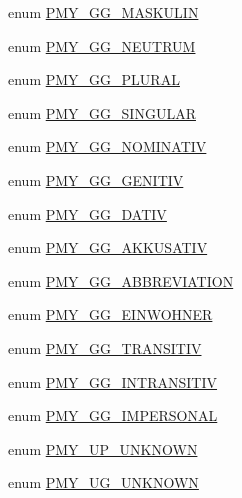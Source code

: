 \begin{DoxyCompactItemize}
enum \hyperlink{gramtab__consts_8php_a58062cdfa5b1425ae635c578e33dfd30}{PMY\_\-GG\_\-MASKULIN} 
\item 
enum \hyperlink{gramtab__consts_8php_a32550cd08ad750a6f974754582cbf075}{PMY\_\-GG\_\-NEUTRUM} 
\item 
enum \hyperlink{gramtab__consts_8php_ac19dafa400068b0d153cf2dda966c598}{PMY\_\-GG\_\-PLURAL} 
\item 
enum \hyperlink{gramtab__consts_8php_a4980f1ec2585b4db87376470f4de6fff}{PMY\_\-GG\_\-SINGULAR} 
\item 
enum \hyperlink{gramtab__consts_8php_a2488431232a41a9160443056f34c5a9e}{PMY\_\-GG\_\-NOMINATIV} 
\item 
enum \hyperlink{gramtab__consts_8php_a5e85b5fce336cc11c93f951479076f5d}{PMY\_\-GG\_\-GENITIV} 
\item 
enum \hyperlink{gramtab__consts_8php_a68d2da6a56b68adf50efa6f1c921c907}{PMY\_\-GG\_\-DATIV} 
\item 
enum \hyperlink{gramtab__consts_8php_a8f76da5e38ae4d0909a400f35a0253be}{PMY\_\-GG\_\-AKKUSATIV} 
\item 
enum \hyperlink{gramtab__consts_8php_aea197904121b5385cf97b59306b3d67f}{PMY\_\-GG\_\-ABBREVIATION} 
\item 
enum \hyperlink{gramtab__consts_8php_ad5198da41cad94dc04740c6f40468490}{PMY\_\-GG\_\-EINWOHNER} 
\item 
enum \hyperlink{gramtab__consts_8php_a50b4fed7260f9b595bc40a07554d8ac8}{PMY\_\-GG\_\-TRANSITIV} 
\item 
enum \hyperlink{gramtab__consts_8php_a1eece742353adb62b9a71d38cd641915}{PMY\_\-GG\_\-INTRANSITIV} 
\item 
enum \hyperlink{gramtab__consts_8php_a4a2062345e893e3e3d52dee4005079d9}{PMY\_\-GG\_\-IMPERSONAL} 
\item 
enum \hyperlink{gramtab__consts_8php_afa0efca345f75d15ff98731124266580}{PMY\_\-UP\_\-UNKNOWN} 
\item 
enum \hyperlink{gramtab__consts_8php_af6e8fa12e0b35be324ddf5c80b147385}{PMY\_\-UG\_\-UNKNOWN} 
\end{DoxyCompactItemize}


